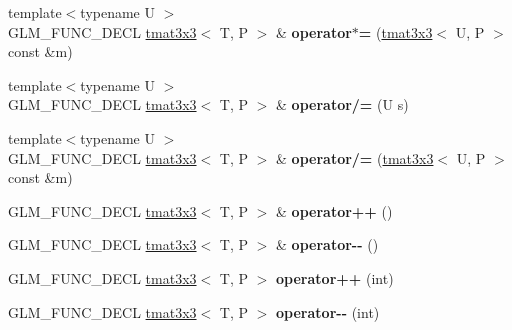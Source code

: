 \begin{DoxyCompactItemize}
\item 
\hypertarget{structglm_1_1tmat3x3_a47400ed8c5e80c7a0c44d1ca79acc556}{{\footnotesize template$<$typename U $>$ }\\G\-L\-M\-\_\-\-F\-U\-N\-C\-\_\-\-D\-E\-C\-L \hyperlink{structglm_1_1tmat3x3}{tmat3x3}$<$ T, P $>$ \& {\bfseries operator$\ast$=} (\hyperlink{structglm_1_1tmat3x3}{tmat3x3}$<$ U, P $>$ const \&m)}\label{structglm_1_1tmat3x3_a47400ed8c5e80c7a0c44d1ca79acc556}

\item 
\hypertarget{structglm_1_1tmat3x3_ad05055d1d22efff71a9f4b98f6f649fd}{{\footnotesize template$<$typename U $>$ }\\G\-L\-M\-\_\-\-F\-U\-N\-C\-\_\-\-D\-E\-C\-L \hyperlink{structglm_1_1tmat3x3}{tmat3x3}$<$ T, P $>$ \& {\bfseries operator/=} (U s)}\label{structglm_1_1tmat3x3_ad05055d1d22efff71a9f4b98f6f649fd}

\item 
\hypertarget{structglm_1_1tmat3x3_a890dc9c4a08a6439357222ae650a0222}{{\footnotesize template$<$typename U $>$ }\\G\-L\-M\-\_\-\-F\-U\-N\-C\-\_\-\-D\-E\-C\-L \hyperlink{structglm_1_1tmat3x3}{tmat3x3}$<$ T, P $>$ \& {\bfseries operator/=} (\hyperlink{structglm_1_1tmat3x3}{tmat3x3}$<$ U, P $>$ const \&m)}\label{structglm_1_1tmat3x3_a890dc9c4a08a6439357222ae650a0222}

\item 
\hypertarget{structglm_1_1tmat3x3_abf574c05769a6e30060fceee846cc823}{G\-L\-M\-\_\-\-F\-U\-N\-C\-\_\-\-D\-E\-C\-L \hyperlink{structglm_1_1tmat3x3}{tmat3x3}$<$ T, P $>$ \& {\bfseries operator++} ()}\label{structglm_1_1tmat3x3_abf574c05769a6e30060fceee846cc823}

\item 
\hypertarget{structglm_1_1tmat3x3_ae5483abbd6a2e5d7698aa6cbd0e1f8c8}{G\-L\-M\-\_\-\-F\-U\-N\-C\-\_\-\-D\-E\-C\-L \hyperlink{structglm_1_1tmat3x3}{tmat3x3}$<$ T, P $>$ \& {\bfseries operator-\/-\/} ()}\label{structglm_1_1tmat3x3_ae5483abbd6a2e5d7698aa6cbd0e1f8c8}

\item 
\hypertarget{structglm_1_1tmat3x3_a4065f5ff3fe1b587e329700e69d5d453}{G\-L\-M\-\_\-\-F\-U\-N\-C\-\_\-\-D\-E\-C\-L \hyperlink{structglm_1_1tmat3x3}{tmat3x3}$<$ T, P $>$ {\bfseries operator++} (int)}\label{structglm_1_1tmat3x3_a4065f5ff3fe1b587e329700e69d5d453}

\item 
\hypertarget{structglm_1_1tmat3x3_a976b9d2832d53ea5049e9e86f6bf8323}{G\-L\-M\-\_\-\-F\-U\-N\-C\-\_\-\-D\-E\-C\-L \hyperlink{structglm_1_1tmat3x3}{tmat3x3}$<$ T, P $>$ {\bfseries operator-\/-\/} (int)}\label{structglm_1_1tmat3x3_a976b9d2832d53ea5049e9e86f6bf8323}


\end{DoxyCompactItemize}
